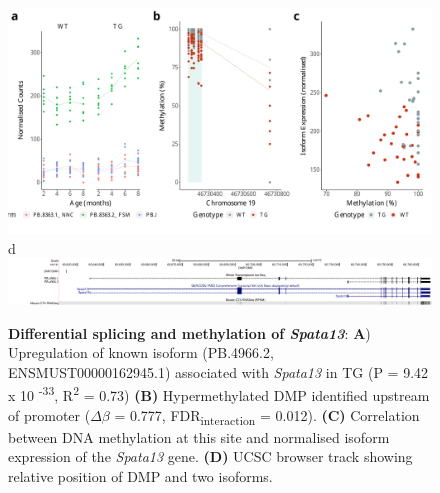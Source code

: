 \begin{figure}[ht]
	\includegraphics[page=2,scale = 0.4]{Figures/WholeDifferentialAnalysis_DMPDMR.pdf}
	\\
	\hspace*{0.2cm}\vspace{0.5cm}\large d
	\\
	\includegraphics[page=1,trim={1.5cm 0 0 0},scale = 0.9]{Figures/SPATA13_DMP.pdf}
	\captionsetup{width=0.95\textwidth}
	\caption[Differential splicing and methylation of \textit{Spata13}]%
	{\textbf{Differential splicing and methylation of \textit{Spata13}}: \textbf{A}) Upregulation of known isoform (PB.4966.2, ENSMUST00000162945.1) associated with \textit{Spata13} in TG (P = 9.42 x 10 \textsuperscript{-33}, R\textsuperscript{2} = 0.73) \textbf{(B)} Hypermethylated DMP identified upstream of promoter ($\Delta$$\beta$ = 0.777, FDR\textsubscript{interaction} = 0.012). \textbf{(C)} Correlation between DNA methylation at this site and normalised isoform expression of the \textit{Spata13} gene. \textbf{(D)} UCSC browser track showing relative position of DMP and two isoforms. }    
	\label{fig:IntMeth_Spata13}
\end{figure}

